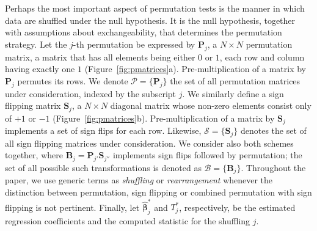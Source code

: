 Perhaps the most important aspect of permutation tests is the manner in which data are shuffled under the null hypothesis. It is the null hypothesis, together with assumptions about exchangeability, that determines the permutation strategy. Let the $j$-th permutation be expressed by $\mathbf{P}_{j}$, a $N \times N$ permutation matrix, a matrix that has all elements being either $0$ or $1$, each row and column having exactly one $1$ (Figure~\ref{fig:pmatrices}a). Pre-multiplication of a matrix by $\mathbf{P}_{j}$ permutes its rows. We denote $\mathcal{P}=\{\mathbf{P}_{j}\}$ the set of all permutation matrices under consideration, indexed by the subscript $j$. We similarly define a sign flipping matrix $\mathbf{S}_{j}$, a $N \times N$ diagonal matrix whose non-zero elements consist only of $+1$ or $-1$ (Figure~\ref{fig:pmatrices}b). Pre-multiplication of a matrix by $\mathbf{S}_{j}$ implements a set of sign flips for each row. Likewise, $\mathcal{S}=\{\mathbf{S}_{j}\}$ denotes the set of all sign flipping matrices under consideration. We consider also both schemes together, where $\mathbf{B}_{j}=\mathbf{P}_{j'}\mathbf{S}_{j''}$ implements sign flips followed by permutation; the set of all possible such transformations is denoted as $\mathcal{B}=\{\mathbf{B}_{j}\}$. Throughout the paper, we use generic terms as \emph{shuffling} or \emph{rearrangement} whenever the distinction between permutation, sign flipping or combined permutation with sign flipping is not pertinent. Finally, let $\boldsymbol{\hat{\beta}}^{*}_{j}$ and $T^{*}_{j}$, respectively, be the estimated regression coefficients and the computed statistic for the shuffling $j$. 

